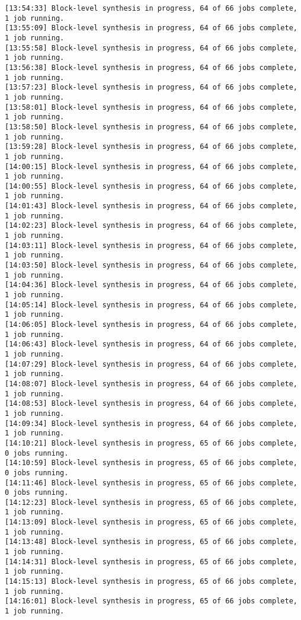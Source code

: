 \begin{lstlisting}[label=func,breaklines=true,breakatwhitespace=false,caption=СОДЕРЖИМОЕ LOG-ФАЙЛА.]
[13:54:33] Block-level synthesis in progress, 64 of 66 jobs complete, 1 job running.
[13:55:09] Block-level synthesis in progress, 64 of 66 jobs complete, 1 job running.
[13:55:58] Block-level synthesis in progress, 64 of 66 jobs complete, 1 job running.
[13:56:38] Block-level synthesis in progress, 64 of 66 jobs complete, 1 job running.
[13:57:23] Block-level synthesis in progress, 64 of 66 jobs complete, 1 job running.
[13:58:01] Block-level synthesis in progress, 64 of 66 jobs complete, 1 job running.
[13:58:50] Block-level synthesis in progress, 64 of 66 jobs complete, 1 job running.
[13:59:28] Block-level synthesis in progress, 64 of 66 jobs complete, 1 job running.
[14:00:15] Block-level synthesis in progress, 64 of 66 jobs complete, 1 job running.
[14:00:55] Block-level synthesis in progress, 64 of 66 jobs complete, 1 job running.
[14:01:43] Block-level synthesis in progress, 64 of 66 jobs complete, 1 job running.
[14:02:23] Block-level synthesis in progress, 64 of 66 jobs complete, 1 job running.
[14:03:11] Block-level synthesis in progress, 64 of 66 jobs complete, 1 job running.
[14:03:50] Block-level synthesis in progress, 64 of 66 jobs complete, 1 job running.
[14:04:36] Block-level synthesis in progress, 64 of 66 jobs complete, 1 job running.
[14:05:14] Block-level synthesis in progress, 64 of 66 jobs complete, 1 job running.
[14:06:05] Block-level synthesis in progress, 64 of 66 jobs complete, 1 job running.
[14:06:43] Block-level synthesis in progress, 64 of 66 jobs complete, 1 job running.
[14:07:29] Block-level synthesis in progress, 64 of 66 jobs complete, 1 job running.
[14:08:07] Block-level synthesis in progress, 64 of 66 jobs complete, 1 job running.
[14:08:53] Block-level synthesis in progress, 64 of 66 jobs complete, 1 job running.
[14:09:34] Block-level synthesis in progress, 64 of 66 jobs complete, 1 job running.
[14:10:21] Block-level synthesis in progress, 65 of 66 jobs complete, 0 jobs running.
[14:10:59] Block-level synthesis in progress, 65 of 66 jobs complete, 0 jobs running.
[14:11:46] Block-level synthesis in progress, 65 of 66 jobs complete, 0 jobs running.
[14:12:23] Block-level synthesis in progress, 65 of 66 jobs complete, 1 job running.
[14:13:09] Block-level synthesis in progress, 65 of 66 jobs complete, 1 job running.
[14:13:48] Block-level synthesis in progress, 65 of 66 jobs complete, 1 job running.
[14:14:31] Block-level synthesis in progress, 65 of 66 jobs complete, 1 job running.
[14:15:13] Block-level synthesis in progress, 65 of 66 jobs complete, 1 job running.
[14:16:01] Block-level synthesis in progress, 65 of 66 jobs complete, 1 job running.

\end{lstlisting}
